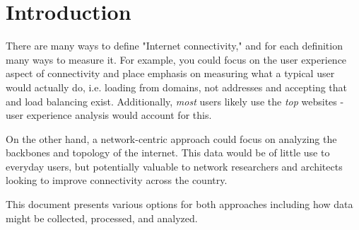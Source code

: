 \section{Introduction}
There are many ways to define "Internet connectivity," and for each definition many ways to measure it. For example, you could focus on the user experience aspect of connectivity and place emphasis on measuring what a typical user would actually do, i.e. loading from domains, not \ip addresses and accepting that \cdns and load balancing exist. Additionally, \textit{most} users likely use the \textit{top} websites - user experience analysis would account for this.

On the other hand, a network-centric approach could focus on analyzing the backbones and topology of the internet. This data would be of little use to everyday users, but potentially valuable to network researchers and architects looking to improve connectivity across the country.

This document presents various options for both approaches including how data might be collected, processed, and analyzed.